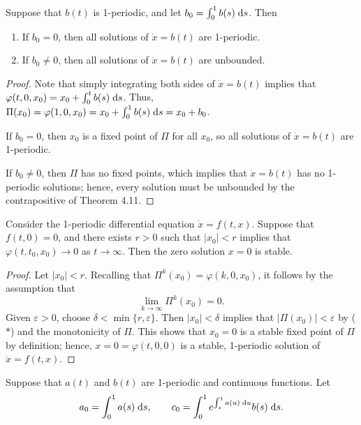\documentclass[nonumber]{homework}
\begin{document}
	\maketitle
	
	 Suppose that $b(t)$ is 1-periodic, and let $b_0 = \int_0^1b(s)\;\text{d} s$. Then
	\begin{enumerate}
		\item If $b_0=0$, then all solutions of $\dot{x} = b(t)$ are 1-periodic. 
		\item If $b_0 \ne0$, then all solutions of $\dot{x} = b(t)$ are unbounded.
	\end{enumerate}
	
	\begin{proof}
		Note that simply integrating both sides of $\dot{x} = b(t)$ implies that $\varphi(t,0,x_0) = x_0 + \int_0^t b(s)\;\text{d} s$. Thus, $\Pi(x_0) = \varphi(1,0,x_0) = x_0 + \int_0^1 b(s)\;\text{d} s = x_0 + b_0$.
		
		If $b_0 = 0$, then $x_0$ is a fixed point of $\Pi$ for all $x_0$, so all solutions of $\dot{x} = b(t)$ are 1-periodic.
		
		If $b_0 \ne 0$, then $\Pi$ has no fixed points, which implies that $\dot{x} = b(t)$ has no 1-periodic solutions; hence, every solution must be unbounded by the contrapositive of Theorem 4.11.
	\end{proof}
	
	 Consider the 1-periodic differential equation $\dot{x} = f(t,x)$. Suppose that $f(t,0) = 0$, and there exists $r > 0$ such that $|x_0| < r$ implies that $\varphi(t,t_0, x_0) \to 0$ as $t \to \infty$. Then the zero solution $x =0$ is stable.
	
	\begin{proof}
		Let $|x_0| < r$. Recalling that $\Pi^k(x_0) = \varphi(k,0,x_0)$, it follows by the assumption that
		\begin{equation*}
			\tag{$*$}
			\lim_{k\to\infty}\Pi^k(x_0) = 0.
		\end{equation*}
		Given $\varepsilon > 0$, choose $\delta < \min\{r, \varepsilon\}$. Then $|x_0| < \delta$ implies that $|\Pi(x_0)| < \varepsilon$ by ($*$) and the monotonicity of $\Pi$. This shows that $x_0=0$ is a stable fixed point of $\Pi$ by definition; hence, $x =0 = \varphi(t,0,0)$ is a stable, 1-periodic solution of $\dot{x} = f(t,x)$.
	\end{proof}
	
	 Suppose that $a(t)$ and $b(t)$ are 1-periodic and continuous functions. Let
	\begin{equation*}
		a_0 = \int_0^1 a(s)\;\text{d} s, \qquad c_0 = \int_0^1 e^{\int_s^1 a(u)\;\text{d} u}b(s)\;\text{d} s.
	\end{equation*}
	
\end{document}
